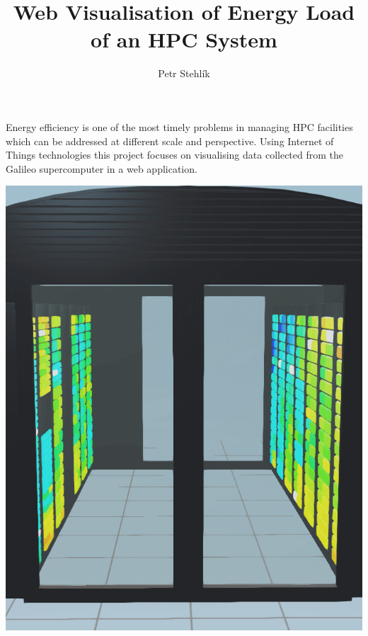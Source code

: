 \documentclass[a4paper, twoside]{article}
\title{Web Visualisation of Energy Load of an HPC System} %
\author{Petr Stehl\'ik} %
\newcommand{\includegraphicsvg}[2][]{%
  \ifnum\pdfstrcmp{\pdffilemoddate{./#2.svg}}%
  {\pdffilemoddate{../gen/#2.pdf}}>0%
  {\immediate\write18{inkscape -z -D --file=./#2.svg %
      --export-pdf=#2.pdf --export-eps=#2.eps %
      --export-area-drawing}}\fi%
  \texttt{[image: \#2]}%
}
\begin{document}
\noindent
\begin{minipage}{0.55\linewidth}
  \maketitle
  \fontsize{14pt}{20pt}\selectfont
  \raggedright
    Energy efficiency is one of the most timely problems in managing HPC facilities which can be addressed at different scale and perspective. Using Internet of Things technologies this project focuses on visualising data collected from the Galileo supercomputer in a web application.
  \end{minipage}\hfill
\begin{minipage}{0.40\textwidth}
  \includegraphics[width=\linewidth]{3d-model}
  \thispagestyle{empty}
\end{minipage}
\vskip 30pt
\frenchspacing
\end{document}
